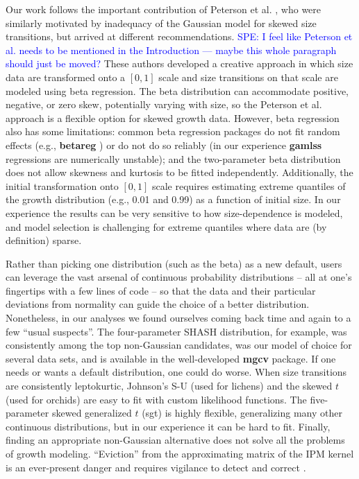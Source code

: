 \documentclass[12pt]{article}
\begin{document}
Our work follows the important contribution of Peterson et al. \citeyear{peterson2019improving}, who were similarly motivated by inadequacy of the Gaussian model for skewed size transitions, but arrived at different recommendations. \textcolor{blue}{SPE: I feel like Peterson et al. needs
to be mentioned in the Introduction --- maybe this whole paragraph should just be moved?} 
These authors developed a creative approach in which size data are transformed onto a $[0,1]$ scale and size transitions on that scale are modeled using beta regression. 
The beta distribution can accommodate positive, negative, or zero skew, potentially varying with size, so the Peterson et al. approach is a 
flexible option for skewed growth data. 
However, beta regression also has some limitations: common beta regression packages do not fit random effects (e.g., \textbf{betareg} \citep{cribari2010beta}) or do not do so reliably (in our experience \textbf{gamlss} regressions are numerically unstable); and the two-parameter beta distribution does not allow skewness and kurtosis to be fitted independently. Additionally, the initial transformation onto $[0,1]$ scale requires estimating extreme quantiles of the growth distribution (e.g., 0.01 and 0.99) as a function of initial size. In our experience the results can be  very sensitive to how size-dependence is modeled, and model selection is challenging for extreme quantiles where data are (by definition) sparse. 

Rather than picking one distribution (such as the beta) as a new default, users can leverage the vast arsenal of continuous probability distributions -- all at one's fingertips with a few lines of code -- so that the data and their particular deviations from normality can guide the choice of a better distribution. 
Nonetheless, in our analyses we found ourselves coming back time and again to a few ``usual suspects''. 
The four-parameter SHASH distribution, for example, was consistently among the top non-Gaussian candidates, was our model of choice for several data sets, and is available in the well-developed \textbf{mgcv} package. 
If one needs or wants a default distribution, one could do worse. 
When size transitions are consistently leptokurtic, Johnson's S-U (used for lichens) and the skewed $t$ (used for orchids) are easy to fit with custom likelihood functions. 
The five-parameter skewed generalized $t$ (sgt) is highly flexible, generalizing many other continuous distributions, but in our experience it can be hard to fit. 
Finally, finding an appropriate non-Gaussian alternative does not solve all the problems of growth modeling. 
``Eviction'' from the approximating matrix of the IPM kernel is an ever-present danger and requires vigilance to detect and correct \citep{williams2012avoiding}. 
\end{document}
